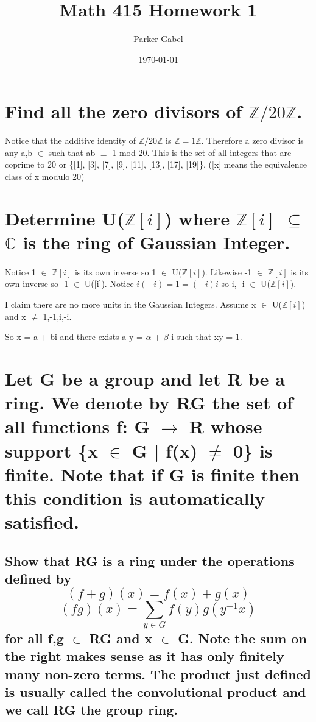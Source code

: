 \documentclass[11pt]{article}
\author{Parker Gabel}
\date{\today}
\title{Math 415 Homework 1}
\begin{document}
\maketitle

\section{Find all the zero divisors of \(\mathbb{Z}/20\mathbb{Z}\).}
\label{sec:org1b2c6dc}
Notice that the additive identity of \(\mathbb{Z}/20\mathbb{Z}\) is \(\mathbb{Z} = 1 \mathbb{Z}\). 
Therefore a zero divisor is any a,b \(\in\)  such that ab \(\equiv\) 1 mod 20. This is the set of all integers that are coprime to 20 or \{[1], [3], [7], [9], [11], [13], [17], [19]\}. ([x] means the equivalence class of x modulo 20)

\section{Determine U(\(\mathbb{Z}[i]\)) where \(\mathbb{Z}[i]\) \(\subseteq\) \(\mathbb{C}\) is the ring of Gaussian Integer.}
\label{sec:org144b44a}
\paragraph{}
Notice 1 \(\in\) \(\mathbb{Z}[i]\) is its own inverse so 1 \(\in\) U(\(\mathbb{Z}[i]\)). Likewise -1 \(\in\) \(\mathbb{Z}[i]\) is its own inverse so -1 \(\in\) U([i]).
Notice \(i(-i) = 1 = (-i)i\) so i, -i \(\in\) U(\(\mathbb{Z}[i]\)). \par 
I claim there are no more units in the Gaussian Integers.
Assume x \(\in\) U(\(\mathbb{Z}[i]\)) and x \(\ne\) 1,-1,i,-i. \par
So x = a + bi and there exists a y = \(\alpha\) + \(\beta\) i such that xy = 1. \par

\section{Let G be a group and let R be a ring.  We denote by RG the set of all functions f: G \(\to\) R whose support \{x \(\in\) G | f(x) \(\ne\) 0\} is finite.  Note that if G is finite then this condition is automatically satisfied.}
\label{sec:org3da982a}
\subsection{Show that RG is a ring under the operations defined by \[(f+g)(x) =f(x) +g(x)\]    \[(fg)(x) =\sum_{y\in G} f(y)g(y^{-1}x) \]for all f,g \(\in\) RG and x \(\in\) G.  Note the sum on the right makes sense as it has only finitely many non-zero terms. The product just defined is usually called the convolutional product and we call RG the group ring.}
\label{sec:orge74ae4c}
\end{document}
